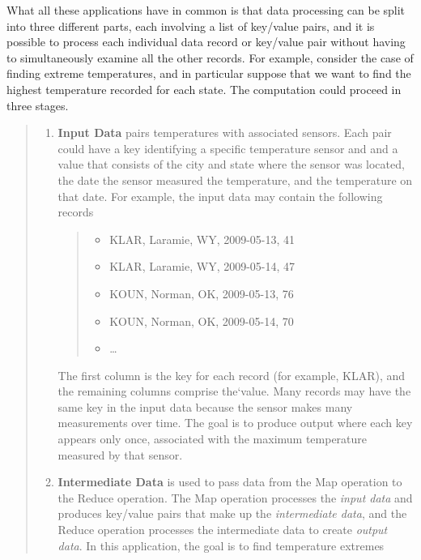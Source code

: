 What all these applications have in common is that data processing
can be split into three different parts, each involving a list of
key/value pairs, and it is possible to process each individual
data record or key/value pair without having to simultaneously
examine all the other records.  For
example, consider the case of finding extreme temperatures,
and in particular suppose that we want to find the highest
temperature recorded for each state.
The computation could proceed in three stages.
\begin{quote}
\begin{enumerate}
    \item \textbf{Input Data} pairs temperatures with associated sensors.
        Each pair could have a key identifying a
        specific temperature sensor and
        and a value that consists of the city and state where
        the sensor was located, the date the sensor measured
        the temperature, and the temperature on that date.
        For example, the input data may contain the following
        records
        \begin {quote}
        \begin{itemize}
            \item KLAR, Laramie, WY, 2009-05-13, 41
            \item KLAR, Laramie, WY, 2009-05-14, 47
            \item KOUN, Norman,  OK, 2009-05-13, 76
            \item KOUN, Norman,  OK, 2009-05-14, 70
            \item \dots
        \end{itemize}
        \end{quote}
        The first column is the key for each record (for example, KLAR),
        and the remaining columns comprise the`value. Many
        records may have the same key in the input data because the
        sensor makes many measurements over time.
        The goal is to produce output where each key appears only once,
        associated with the maximum temperature measured by that sensor.
    \item \textbf{Intermediate Data} is used to pass data from
        the Map operation to the Reduce operation. The Map operation
        processes the \emph{input data} and produces key/value pairs
        that make up the \emph{intermediate data}, and the Reduce operation
        processes the intermediate data to create \emph{output data}.
        In this application, the goal is to find temperature extremes

\end{enumerate}
\end{quote}
